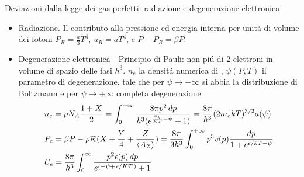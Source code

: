 \begin{wordonframe}{Deviazioni dalla legge dei gas perfetti: radiazione e degenerazione elettronica}
\begin{itemize}
	\item Radiazione. Il contributo alla pressione ed energia interna per unit\'a di volume dei fotoni $P_R=\frac{a}{3}T^4$, $u_R=aT^4$, e $P-P_R=\beta P$.
	\item Degenerazione elettronica - Principio di Pauli: non pi\'u di 2 elettroni in volume di spazio delle fasi $h^3$. $n_e$ la densit\'a numerica di \Pelectron, $\psi(P,T)$ il parametro di degenerazione, tale che per $\psi\to-\infty$ si abbia la distribuzione di Boltzmann e per $\psi\to+\infty$ completa degenerazione
	\begin{align*}
	&n_e=\rho N_A\frac{1+X}{2}=\int_{0}^{+\infty}{}\frac{8\pi p^2\,dp}{h^3(e^{\frac{u_k}{KT}-\psi}+1)}=\frac{8\pi}{h^3}(2m_ekT)^{3/2}a(\psi)\\
	&P_e=\beta P-\rho\mathcal{R}{}(X+\frac{Y}{4}+\frac{Z}{\langle A_Z \rangle})=\frac{8\pi}{3h^3}\int_{0}^{+\infty}{}p^3v(p)\frac{dp}{1+e^{\epsilon/kT-\psi}}\\
	&U_e=\frac{8\pi}{h^3}\int_0^{\infty}\frac{p^2\epsilon(p)\,dp}{e^{(-\psi+\left.{\epsilon}\middle/{KT}\right.)}+1}
	\end{align*}
\end{itemize}
\end{wordonframe}

